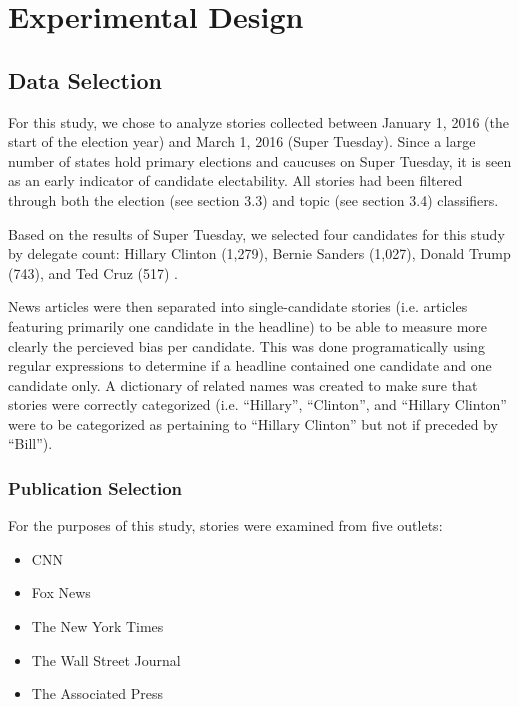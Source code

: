 \chapter{Experimental Design}


\section {Data Selection} 

For this study, we chose to analyze stories collected between January 1, 2016 (the start of the election year) and March 1, 2016 (Super Tuesday). Since a large number of states hold primary elections and caucuses on Super Tuesday, it is seen as an early indicator of candidate electability. All stories had been filtered through both the election (see section 3.3) and topic (see section 3.4) classifiers.

Based on the results of Super Tuesday, we selected four candidates for this study by delegate count: Hillary Clinton (1,279), Bernie Sanders (1,027), Donald Trump (743), and Ted Cruz (517) \cite{March45online}.

News articles were then separated into single-candidate stories (i.e. articles featuring primarily one candidate in the headline) to be able to measure more clearly the percieved bias per candidate. This was done programatically using regular expressions to determine if a headline contained one candidate and one candidate only. A dictionary of related names was created to make sure that stories were correctly categorized (i.e. ``Hillary'', ``Clinton'', and ``Hillary Clinton'' were to be categorized as pertaining to ``Hillary Clinton'' but not if preceded by ``Bill'').

\subsection {Publication Selection}

For the purposes of this study, stories were examined from five outlets: 

\begin{itemize}
\itemsep-1em 
  \item CNN
  \item Fox News  
  \item The New York Times
  \item The Wall Street Journal 
  \item The Associated Press 
\end{itemize}

